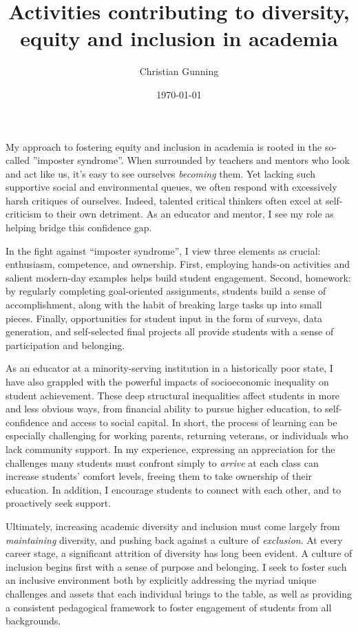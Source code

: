 \documentclass[12pt]{article}
\author{Christian Gunning}
\title{Activities contributing to diversity, equity and inclusion in academia}
\date{\today}
\begin{document}

My approach to fostering equity and inclusion in academia 
is rooted in the so-called ''imposter syndrome''.  When surrounded by 
teachers and mentors who look and act like us, it's easy to 
see ourselves {\em becoming} them.  Yet lacking such supportive 
social and environmental queues, we often respond with excessively
harsh critiques of ourselves. Indeed, talented critical thinkers often 
excel at self-criticism to their own detriment.
As an educator and mentor, I see my role as helping
bridge this confidence gap.

In the fight against ``imposter syndrome'', I view three 
elements as crucial: enthusiasm, competence, and ownership.
First, employing hands-on
activities and salient modern-day examples helps build student engagement.
Second, homework: by regularly completing goal-oriented assignments, 
students build a sense of accomplishment, along with the habit of 
breaking large tasks up into small pieces.  Finally, opportunities
for student input in the form of surveys, data generation, and 
self-selected final projects all provide students with a sense 
of participation and belonging. 

As an educator at a minority-serving institution in
a historically poor state, I have also grappled with the powerful
impacts of socioeconomic inequality on student achievement. 
These deep structural inequalities affect students in more 
and less obvious ways, from financial ability to pursue higher 
education, to self-confidence and access to social capital.
In short, the process of learning can be especially challenging
for working parents, returning veterans, or individuals who
lack community support. In my experience, expressing an 
appreciation for the challenges many students must confront
simply to {\em arrive} at each class can increase students'
comfort levels, freeing them to take ownership of their education.
In addition, I encourage students to connect with each other, 
and to proactively seek support.

Ultimately, increasing academic diversity and inclusion must 
come largely from {\em maintaining} diversity, and pushing back
against a culture of {\em exclusion}. At every career stage, a
significant attrition of diversity has long been 
evident. A culture of inclusion begins first with a sense of 
purpose and belonging. I seek to foster such an inclusive 
environment both by explicitly addressing the myriad unique 
challenges and 
assets that each individual brings to the table, as well as 
providing a consistent pedagogical framework to foster 
engagement of students from all backgrounds. 
\end{document}
